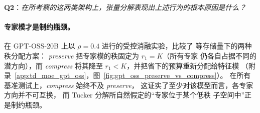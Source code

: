 \begin{tcolorbox}
    \textbf{Q2}：\textit{在所考察的这两类架构上，张量分解表现出上述行为的根本原因是什么？}
\end{tcolorbox}

\paragraph{专家模才是制约瓶颈。}
在 GPT-OSS-20B 上以 $\rho = 0.4$ 进行的受控消融实验，比较了
等存储量下的两种秩分配方案：
\emph{preserve} 把专家模的秩固定为 $r_1 = K$（所有专家
仍各自占据不同的潜方向），而 \emph{compress} 将其降至
$r_1 < K$，并把省下的预算重新分配给特征模
（附录~\ref{app:td_moe_gpt_oss}，图~\ref{fig:gpt_oss_preserve_vs_compress}）。
在所有基准测试上，\emph{compress} 始终不及 \emph{preserve}，
这证实了至少对该模型而言，各专家方向并不可互换，
而 Tucker 分解所自然假定的``专家位于某个低秩
子空间中''正是制约瓶颈。
 
 



